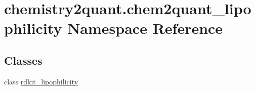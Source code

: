 \hypertarget{namespacechemistry2quant_1_1chem2quant__lipophilicity}{}\section{chemistry2quant.\+chem2quant\+\_\+lipophilicity Namespace Reference}
\label{namespacechemistry2quant_1_1chem2quant__lipophilicity}
\subsection*{Classes}
\begin{DoxyCompactItemize}
\item
class \hyperlink{classchemistry2quant_1_1chem2quant__lipophilicity_1_1rdkit__lipophilicity}{rdkit\+\_\+lipophilicity}
\end{DoxyCompactItemize}
